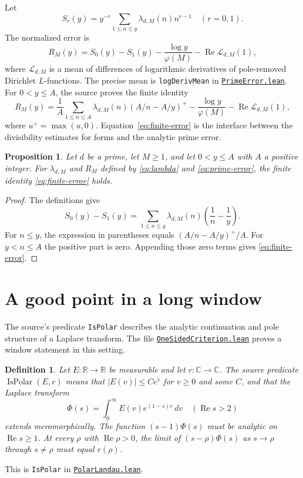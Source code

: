 \documentclass[11pt,oneside,openany]{amsbook}
\newtheorem{proposition}[theorem]{Proposition}
\newtheorem{definition}[theorem]{Definition}
\theoremstyle{remark}
\numberwithin{equation}{section}
\newcommand{\C}{\mathbb C}
\newcommand{\R}{\mathbb R}
\newcommand{\re}{\operatorname{Re}}
\newcommand{\ghroot}{https://github.com/lsernau/grh-lean/blob/}
\newcommand{\ghrev}{72fead102f663d5c7a407964a13dc0cf9d977207}
\newcommand{\leanfile}[2]{%
  \href{\ghroot\ghrev/grh-compact/src/#1}{\nolinkurl{#2}}}
\begin{document}
Let
\[
S_r(y)=y^{-r}\sum_{1\le n\le y}\lambda_{d,M}(n)n^{r-1}
\quad(r=0,1).
\]
The normalized error is
\begin{equation}
\label{eq:prime-error}
R_M(y)=S_0(y)-S_1(y)-\frac{\log y}{\varphi(M)}
       -\re\mathcal L_{d,M}(1),
\end{equation}
where $\mathcal L_{d,M}$ is a mean of differences of logarithmic
derivatives of pole-removed Dirichlet $L$-functions. The precise mean
is \texttt{logDerivMean} in
\leanfile{New/Endgame/PrimeError.lean}{PrimeError.lean}.
For $0<y\le A$, the source proves the finite identity
\begin{equation}
\label{eq:finite-error}
R_M(y)=\frac1A\sum_{1\le n\le A}\lambda_{d,M}(n)
          (A/n-A/y)^+
      -\frac{\log y}{\varphi(M)}
      -\re\mathcal L_{d,M}(1),
\end{equation}
where $u^+=\max(u,0)$.
Equation~\eqref{eq:finite-error} is the interface between the
divisibility estimates for forms and the analytic prime error.

\begin{proposition}
\label{prop:finite-error}
Let $d$ be a prime, let $M\ge1$, and let $0<y\le A$ with
$A$ a positive integer. For $\lambda_{d,M}$ and $R_M$ defined
by \eqref{eq:lambda} and \eqref{eq:prime-error}, the finite
identity \eqref{eq:finite-error} holds.
\end{proposition}
\begin{proof}
The definitions give
\[
S_0(y)-S_1(y)
=\sum_{1\le n\le y}\lambda_{d,M}(n)
   \left(\frac1n-\frac1y\right).
\]
For $n\le y$, the expression in parentheses equals
$(A/n-A/y)^+/A$. For $y<n\le A$ the positive part is zero.
Appending those zero terms gives \eqref{eq:finite-error}.
\end{proof}

\section{A good point in a long window}
\label{sec:window}
The source's predicate \texttt{IsPolar} describes the analytic
continuation and pole structure of a Laplace transform. The file
\leanfile{New/Endgame/OneSidedCriterion.lean}%
{OneSidedCriterion.lean} proves a window statement in this setting.

\begin{definition}
\label{def:is-polar}
Let $E:\R\to\R$ be measurable and let $r:\C\to\C$.
The source predicate $\operatorname{IsPolar}(E,r)$ means that
$|E(v)|\le C e^v$ for $v\ge0$ and some $C$, and that
the Laplace transform
\[
\Phi(s)=\int_0^\infty E(v)e^{(1-s)v}\,dv
\quad(\re s>2)
\]
extends meromorphically. The function $(s-1)\Phi(s)$
must be analytic on $\re s\ge1$. At every $\rho$ with
$\re\rho>0$, the limit of $(s-\rho)\Phi(s)$ as
$s\to\rho$ through $s\ne\rho$ must equal $r(\rho)$.
\end{definition}
This is \texttt{IsPolar} in
\leanfile{Lib/Analytic/Landau/PolarLandau.lean}%
{PolarLandau.lean}.
\end{document}
